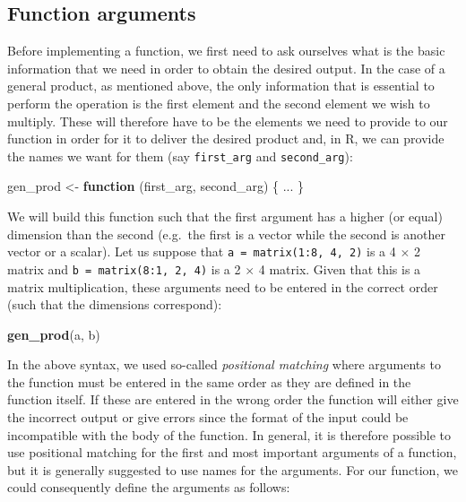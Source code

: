 \documentclass[12pt,]{krantz}
\newenvironment{Shaded}{\begin{snugshade}}{\end{snugshade}}
\newcommand{\KeywordTok}[1]{\textcolor[rgb]{0.27,0.27,0.27}{\textbf{#1}}}
\newcommand{\StringTok}[1]{\textcolor[rgb]{0.5,0.5,0.5}{#1}}
\newcommand{\ControlFlowTok}[1]{\textcolor[rgb]{0.27,0.27,0.27}{\textbf{#1}}}
\newcommand{\NormalTok}[1]{#1}
\begin{document}
\subsection{Function arguments}\label{function-arguments}

Before implementing a function, we first need to ask ourselves what is
the basic information that we need in order to obtain the desired
output. In the case of a general product, as mentioned above, the only
information that is essential to perform the operation is the first
element and the second element we wish to multiply. These will therefore
have to be the elements we need to provide to our function in order for
it to deliver the desired product and, in R, we can provide the names we
want for them (say \texttt{first\_arg} and \texttt{second\_arg}):

\begin{Shaded}
\begin{Highlighting}[]
\NormalTok{gen_prod <-}\StringTok{ }\ControlFlowTok{function}\NormalTok{ (first_arg, second_arg) \{}
\NormalTok{  ...}
\NormalTok{\}}
\end{Highlighting}
\end{Shaded}

We will build this function such that the first argument has a higher
(or equal) dimension than the second (e.g.~the first is a vector while
the second is another vector or a scalar). Let us suppose that
\texttt{a\ =\ matrix(1:8,\ 4,\ 2)} is a 4 \(\times\) 2 matrix and
\texttt{b\ =\ matrix(8:1,\ 2,\ 4)} is a 2 \(\times\) 4 matrix. Given
that this is a matrix multiplication, these arguments need to be entered
in the correct order (such that the dimensions correspond):

\begin{Shaded}
\begin{Highlighting}[]
\KeywordTok{gen_prod}\NormalTok{(a, b)}
\end{Highlighting}
\end{Shaded}

In the above syntax, we used so-called \emph{positional matching} where
arguments to the function must be entered in the same order as they are
defined in the function itself. If these are entered in the wrong order
the function will either give the incorrect output or give errors since
the format of the input could be incompatible with the body of the
function. In general, it is therefore possible to use positional
matching for the first and most important arguments of a function, but
it is generally suggested to use names for the arguments. For our
function, we could consequently define the arguments as follows:
\end{document}
